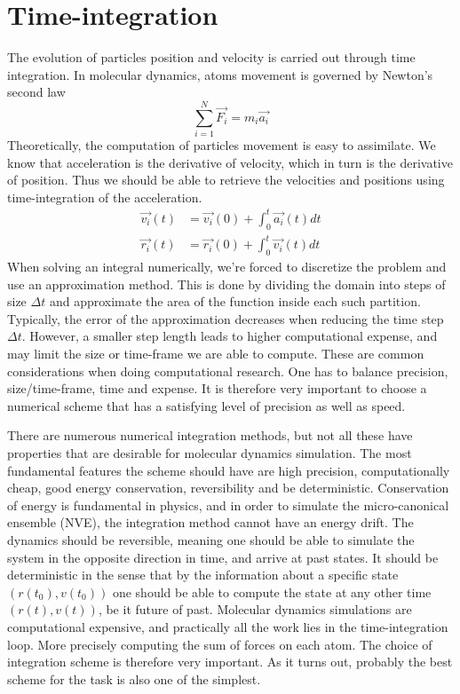 \documentclass[twoside,english]{uiofysmaster}
\begin{document}
\section{Time-integration}
The evolution of particles position and velocity is carried out through time integration.
In molecular dynamics, atoms movement is governed by Newton's second law
\begin{equation}
	\sum_{i=1}^{N}\vec{F_i} = m_i\vec{a_i}
\end{equation}
Theoretically, the computation of particles movement is easy to assimilate.
We know that acceleration is the derivative of velocity, which in turn is the derivative of position.
Thus we should be able to retrieve the velocities and positions using time-integration of the acceleration.
\begin{align}
	\vec{v_i}(t) &= \vec{v_i}(0) + \int_{0}^{t}\vec{a_i}(t) dt \\
	\vec{r_i}(t) &= \vec{r_i}(0) + \int_{0}^{t}\vec{v_i}(t) dt
\end{align}
When solving an integral numerically, we're forced to discretize the problem and use an approximation method.
This is done by dividing the domain into steps of size $\Delta t$ and approximate the area of the function inside each such partition.
Typically, the error of the approximation decreases when reducing the time step $\Delta t$. 
However, a smaller step length leads to higher computational expense, and may limit the size or time-frame we are able to compute. 
These are common considerations when doing computational research. 
One has to balance precision, size/time-frame, time and expense. 
It is therefore very important to choose a numerical scheme that has a satisfying level of precision as well as speed. 

There are numerous numerical integration methods, but not all these have properties that are desirable for molecular dynamics simulation. 
The most fundamental features the scheme should have are high precision, computationally cheap, good energy conservation, reversibility and be deterministic.
Conservation of energy is fundamental in physics, and in order to simulate the micro-canonical ensemble (NVE), the integration method cannot have an energy drift.
The dynamics should be reversible, meaning one should be able to simulate the system in the opposite direction in time, and arrive at past states.
It should be deterministic in the sense that by the information about a specific state $(r(t_0), v(t_0))$ one should be able to compute the state at any other time $(r(t), v(t))$, be it future of past.
Molecular dynamics simulations are computational expensive, and practically all the work lies in the time-integration loop. More precisely computing the sum of forces on each atom. 
The choice of integration scheme is therefore very important. 
As it turns out, probably the best scheme for the task is also one of the simplest. 
\end{document}

